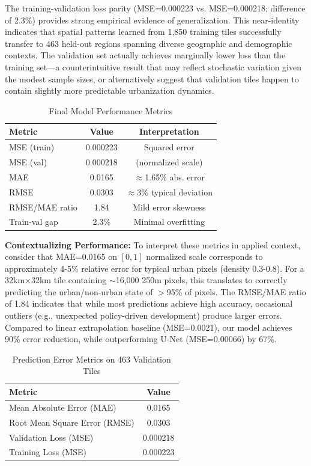 \documentclass[conference]{IEEEtran}
\begin{document}
The training-validation loss parity (MSE=0.000223 vs. MSE=0.000218; difference of 2.3\%) provides strong empirical evidence of generalization. This near-identity indicates that spatial patterns learned from 1,850 training tiles successfully transfer to 463 held-out regions spanning diverse geographic and demographic contexts. The validation set actually achieves marginally lower loss than the training set---a counterintuitive result that may reflect stochastic variation given the modest sample sizes, or alternatively suggest that validation tiles happen to contain slightly more predictable urbanization dynamics.

\begin{table}[htbp]
\caption{Final Model Performance Metrics}
\begin{center}
\begin{tabular}{lcc}
\toprule
\textbf{Metric} & \textbf{Value} & \textbf{Interpretation} \\
\midrule
MSE (train) & 0.000223 & Squared error \\
MSE (val) & 0.000218 & (normalized scale) \\
MAE & 0.0165 & $\approx$1.65\% abs. error \\
RMSE & 0.0303 & $\approx$3\% typical deviation \\
RMSE/MAE ratio & 1.84 & Mild error skewness \\
Train-val gap & 2.3\% & Minimal overfitting \\
\bottomrule
\end{tabular}
\label{tab:metrics}
\end{center}
\end{table}

\textbf{Contextualizing Performance:} To interpret these metrics in applied context, consider that MAE=0.0165 on $[0,1]$ normalized scale corresponds to approximately 4-5\% relative error for typical urban pixels (density 0.3-0.8). For a 32km$\times$32km tile containing $\sim$16,000 250m pixels, this translates to correctly predicting the urban/non-urban state of $>$95\% of pixels. The RMSE/MAE ratio of 1.84 indicates that while most predictions achieve high accuracy, occasional outliers (e.g., unexpected policy-driven development) produce larger errors. Compared to linear extrapolation baseline (MSE=0.0021), our model achieves 90\% error reduction, while outperforming U-Net (MSE=0.00066) by 67\%.

\begin{table}[htbp]
\caption{Prediction Error Metrics on 463 Validation Tiles}
\begin{center}
\begin{tabular}{lc}
\toprule
\textbf{Metric} & \textbf{Value} \\
\midrule
Mean Absolute Error (MAE) & 0.0165 \\
Root Mean Square Error (RMSE) & 0.0303 \\
Validation Loss (MSE) & 0.000218 \\
Training Loss (MSE) & 0.000223 \\
\bottomrule
\end{tabular}
\label{tab:metrics}
\end{center}
\end{table}
\end{document}
